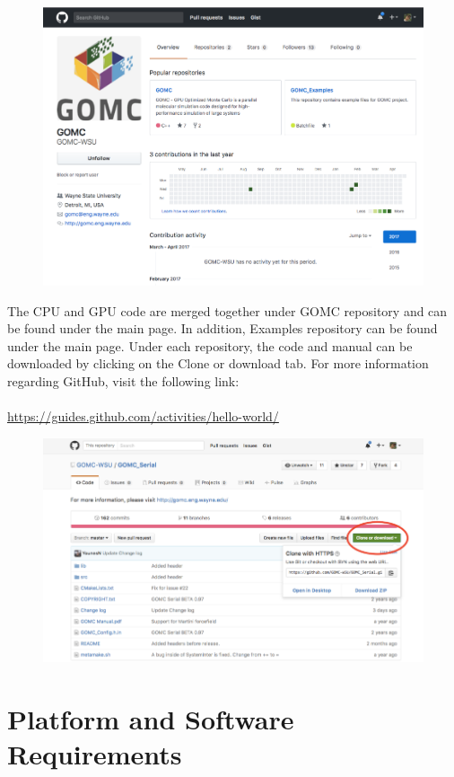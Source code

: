 \begin{figure}[H]
\centering
\includegraphics[scale=0.6]{images/github}
\end{figure}

The CPU and GPU code are merged together under GOMC repository and can be found under the main page. In addition, Examples repository can be found under the main page. Under each repository, the code and manual can be downloaded by clicking on the Clone or download tab. For more information regarding GitHub, visit the following link:\\\\
\url{https://guides.github.com/activities/hello-world/}

\begin{figure}[H]
\centering
\includegraphics[scale=0.8]{images/clone}
\end{figure}

\section{Platform and Software Requirements}

